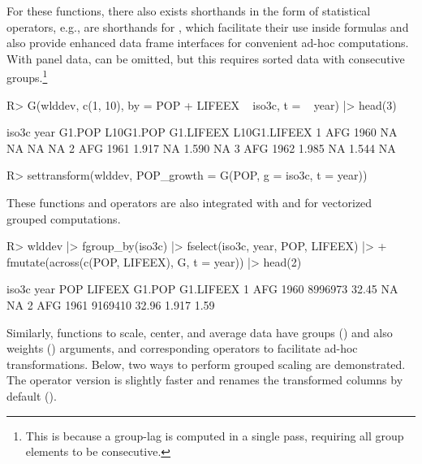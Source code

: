 \documentclass[article]{jss}
\newcommand{\fct}[1]{\code{#1()}}
\begin{document}
%
For these functions, there also exists shorthands in the form of statistical operators, e.g.,  are shorthands for , which facilitate their use inside formulas and also provide enhanced data frame interfaces for convenient ad-hoc computations. With panel data,  can be omitted, but this requires sorted data with consecutive groups.\footnote{This is because a group-lag is computed in a single pass, requiring all group elements to be consecutive.}
%
\begin{Schunk}
\begin{Sinput}
R> G(wlddev, c(1, 10), by = POP + LIFEEX ~ iso3c, t = ~ year) |> head(3)
\end{Sinput}
\begin{Soutput}
  iso3c year G1.POP L10G1.POP G1.LIFEEX L10G1.LIFEEX
1   AFG 1960     NA        NA        NA           NA
2   AFG 1961  1.917        NA     1.590           NA
3   AFG 1962  1.985        NA     1.544           NA
\end{Soutput}
\begin{Sinput}
R> settransform(wlddev, POP_growth = G(POP, g = iso3c, t = year))
\end{Sinput}
\end{Schunk}
%
These functions and operators are also integrated with \fct{fsummarise} and \fct{fmutate} for vectorized grouped computations.
%
\begin{Schunk}
\begin{Sinput}
R> wlddev |> fgroup_by(iso3c) |> fselect(iso3c, year, POP, LIFEEX) |>
+    fmutate(across(c(POP, LIFEEX), G, t = year)) |> head(2)
\end{Sinput}
\begin{Soutput}
  iso3c year     POP LIFEEX G1.POP G1.LIFEEX
1   AFG 1960 8996973  32.45     NA        NA
2   AFG 1961 9169410  32.96  1.917      1.59
\end{Soutput}
\end{Schunk}
%
Similarly, functions to scale, center, and average data have groups () and also weights () arguments, and corresponding operators  to facilitate ad-hoc transformations. Below, two ways to perform grouped scaling are demonstrated. The operator version is slightly faster and renames the transformed columns by default ().
%
\end{document}
